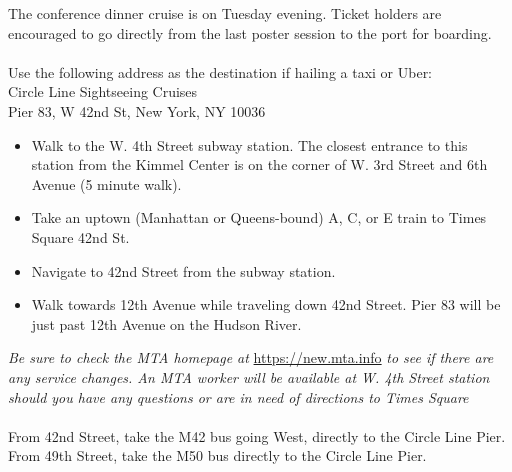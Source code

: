 The conference dinner cruise is on Tuesday evening. Ticket holders are encouraged to go directly from the last poster session to the port for boarding.\\ 

\\
Use the following address as the destination if hailing a taxi or Uber:\\
\indent Circle Line Sightseeing Cruises\\
\indent Pier 83, W 42nd St, New York, NY 10036\\

\begin{itemize}
\item Walk to the W. 4th Street subway station. The closest entrance to this station from the Kimmel Center is on the corner of W. 3rd Street and 6th Avenue (5 minute walk).
\item Take an uptown (Manhattan or Queens-bound) A, C, or E train to Times Square 42nd St.
\item Navigate to 42nd Street from the subway station.
\item Walk towards 12th Avenue while traveling down 42nd Street. Pier 83 will be just past 12th Avenue on the Hudson River.
\end{itemize}
{\it Be sure to check the MTA homepage at} \url{https://new.mta.info} {\it to see if there are any service changes. An MTA worker will be available at W. 4th Street station should you have any questions or are in need of directions to Times Square}\\

\\
From 42nd Street, take the M42 bus going West, directly to the Circle Line Pier. From 49th Street, take the M50 bus directly to the Circle Line Pier.


